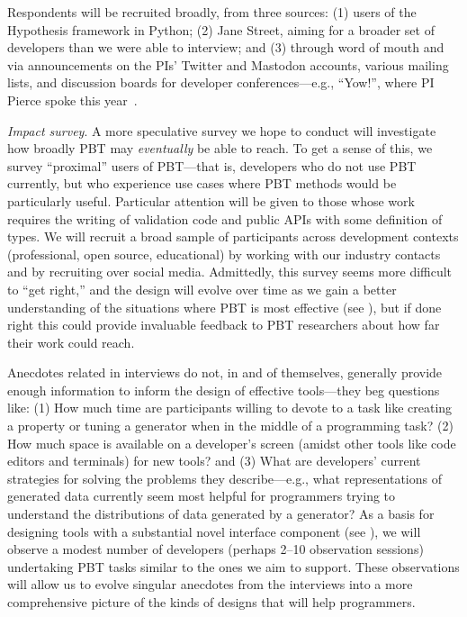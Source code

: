 Respondents will
be recruited broadly, from three sources: (1)
users of the Hypothesis framework in Python; (2) Jane Street, aiming for
a broader set of developers than we were able to interview; and (3)
through word of mouth and via announcements on the PIs' Twitter and Mastodon
accounts, various mailing lists, and discussion boards for developer
conferences---e.g., ``Yow!'', where PI Pierce spoke this
year~\cite{Pierce:Yow22}.

\emph{Impact survey}. A more speculative survey we hope to conduct
will investigate
how broadly PBT may {\em eventually} be able to reach.  To get a sense of this, we
survey ``proximal'' users of PBT---that is, developers who do not use PBT
currently, but who experience use cases where PBT methods would be particularly
useful.  Particular attention will be given to those whose work requires the
writing of validation code and public APIs with some definition of types. We
will recruit a broad sample of participants across development contexts
(professional, open source, educational) by working with our industry contacts
and by recruiting over social media. Admittedly, this survey seems more
difficult to ``get right,'' and the design will evolve over time as we gain a
better understanding of the situations where PBT is most effective
(see ), but if done right this could provide invaluable
feedback to PBT researchers about how far their work could reach.

%
Anecdotes related in interviews do not, in and of
themselves, generally provide enough information to inform the design of
effective tools---they beg questions like: (1) How much time
are participants willing to devote to
a task like creating a property or tuning a generator when in the
middle of a programming task? (2) How much space is available on a developer's
screen (amidst other tools like code editors and terminals) for
new
tools? and (3) What are developers' current strategies for solving the
problems they describe---e.g., what representations of generated data
currently seem most helpful
for programmers trying to understand the distributions of data generated by a
generator? As a basis for designing tools with a substantial novel interface
component (see ), we will observe a modest number
of developers (perhaps 2--10 observation sessions)
undertaking PBT tasks similar to the ones we
aim to support. These observations will allow us to evolve
singular anecdotes from the interviews into a more comprehensive picture of
the kinds of designs that will help programmers.

